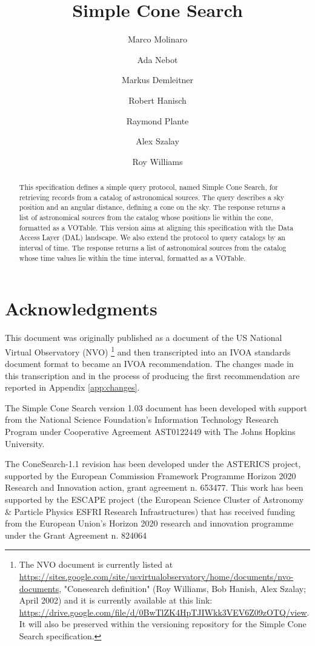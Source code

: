 \documentclass[11pt,a4paper]{ivoa}
\title{Simple Cone Search}
\author[http://www.ivoa.net/twiki/bin/view/IVOA/MarcoMolinaro]{Marco Molinaro}
\author[http://www.ivoa.net/twiki/bin/view/IVOA/AdaNebot]{Ada Nebot}
\author[http://www.ivoa.net/twiki/bin/view/IVOA/MarkusDemleitner]{Markus Demleitner}
\author[http://www.ivoa.net/twiki/bin/view/IVOA/BobHanisch]{Robert Hanisch}
\author[http://www.ivoa.net/twiki/bin/view/IVOA/RayPlante]{Raymond Plante}
\author[http://www.ivoa.net/twiki/bin/view/IVOA/AlexSzalay]{Alex Szalay}
\author[http://www.ivoa.net/twiki/bin/view/IVOA/RoyWilliams]{Roy Williams}
\begin{document}
 \begin{abstract} This specification defines a simple
query protocol, named Simple Cone Search, for retrieving records from a
catalog of astronomical sources.  The query describes a sky position and
an angular distance, defining a cone on the sky.  The response returns a
list of astronomical sources from the catalog whose positions lie within
the cone, formatted as a VOTable.  This version aims at aligning this
specification with the Data Access Layer (DAL) landscape.  We also
extend the protocol to query catalogs by an interval of time.  The
response returns a list of astronomical sources from the catalog whose
time values lie within the time interval, formatted as a
VOTable.


\end{abstract}


\section*{Acknowledgments} This document was originally published as a
document of the US National Virtual Observatory (NVO)
\footnote{
	The NVO document is currently listed at
	\url{https://sites.google.com/site/usvirtualobservatory/home/documents/nvo-documents},
  "Conesearch definition" (Roy Williams, Bob Hanish, Alex Szalay; April
	2002) and it is currently available at this link:
	\url{https://drive.google.com/file/d/0BwTlZK4HpTJIWkk3VEV6Z09zOTQ/view}.
	It will also be preserved within the versioning repository for the
	Simple Cone Search specification.
}
and then transcripted into an
IVOA standards document format to became an IVOA recommendation. The
changes made in this transcription and in the process of producing the
first recommendation are reported in Appendix \ref{app:changes}.

The Simple Cone Search version 1.03 document has been developed with
support from the National Science Foundation's Information Technology
Research Program under Cooperative Agreement AST0122449 with The Johns
Hopkins University.

The ConeSearch-1.1 revision has been developed under the ASTERICS
project, supported by the European Commission Framework Programme
Horizon 2020 Research and Innovation action, grant agreement n. 653477.
This work has been supported by the ESCAPE project (the European Science
Cluster of Astronomy \& Particle Physics ESFRI Research Infrastructures)
that has received funding from the European Union’s Horizon 2020
research and innovation programme under the Grant Agreement n. 824064
\end{document}
